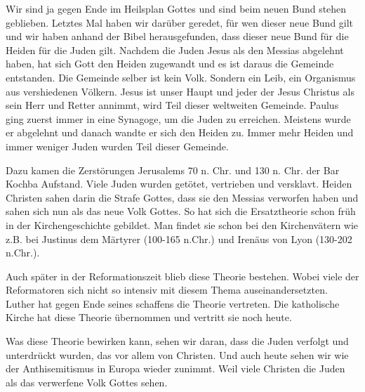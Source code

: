     \begin{otsblock}    
        Wir sind ja gegen Ende im Heilsplan Gottes und sind beim neuen Bund stehen geblieben. Letztes Mal haben wir darüber geredet, für wen dieser neue Bund gilt und wir haben anhand der Bibel herausgefunden, dass dieser neue Bund für die Heiden  für die Juden gilt. Nachdem die Juden Jesus als den Messias abgelehnt haben, hat sich Gott den Heiden zugewandt und es ist daraus die Gemeinde entstanden. Die Gemeinde selber ist kein Volk. Sondern ein Leib, ein Organismus aus vershiedenen Völkern. Jesus ist unser Haupt und jeder der Jesus Christus als sein Herr und Retter annimmt, wird Teil dieser weltweiten Gemeinde. Paulus ging zuerst immer in eine Synagoge, um die Juden zu erreichen. Meistens wurde er abgelehnt und danach wandte er sich den Heiden zu. Immer mehr Heiden und immer weniger Juden wurden Teil dieser Gemeinde.

        Dazu kamen die Zerstörungen Jerusalems 70 n. Chr. und 130 n. Chr. der Bar Kochba Aufstand. Viele Juden wurden getötet, vertrieben und versklavt. Heiden Christen sahen darin die Strafe Gottes, dass sie den Messias verworfen haben und sahen sich nun als das neue Volk Gottes. So hat sich die Ersatztheorie schon früh in der Kirchengeschichte gebildet. Man findet sie schon bei den Kirchenvätern wie z.B. bei Justinus dem Märtyrer (100-165 n.Chr.) und Irenäus von Lyon (130-202 n.Chr.).

        Auch später in der Reformationszeit blieb diese Theorie bestehen. Wobei viele der Reformatoren sich nicht so intensiv mit diesem Thema auseinandersetzten. Luther hat gegen Ende seines schaffens die Theorie vertreten. Die katholische Kirche hat diese Theorie übernommen und vertritt sie noch heute.

        Was diese Theorie bewirken kann, sehen wir daran, dass die Juden verfolgt und unterdrückt wurden, das vor allem von Christen. Und auch heute sehen wir wie der Anthisemitismus in Europa wieder zunimmt. Weil viele Christen die Juden als das verwerfene Volk Gottes sehen.


\end{otsblock}
